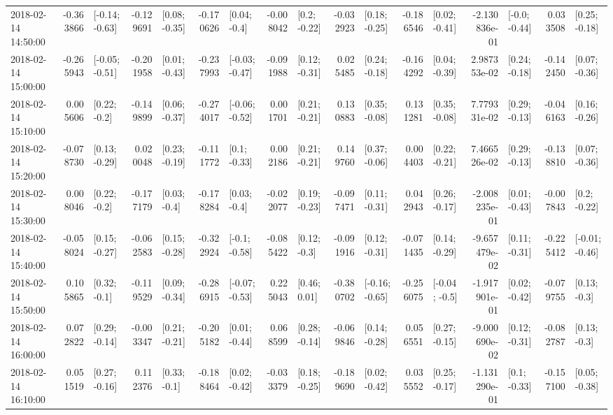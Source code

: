 \begin{tabular}{lrlrlrlrlrlrlrlrl}
2018-02-14 14:50:00 & -0.363866 &  [-0.14; -0.63] & -0.129691 &   [0.08; -0.35] & -0.170626 &    [0.04; -0.4] & -0.008042 &    [0.2; -0.22] & -0.032923 &   [0.18; -0.25] & -0.186546 &   [0.02; -0.41] & -2.130836e-01 &   [-0.0; -0.44] &  0.033508 &   [0.25; -0.18] \\
2018-02-14 15:00:00 & -0.265943 &  [-0.05; -0.51] & -0.201958 &   [0.01; -0.43] & -0.237993 &  [-0.03; -0.47] & -0.091988 &   [0.12; -0.31] &  0.025485 &   [0.24; -0.18] & -0.164292 &   [0.04; -0.39] &  2.987353e-02 &   [0.24; -0.18] & -0.142450 &   [0.07; -0.36] \\
2018-02-14 15:10:00 &  0.005606 &    [0.22; -0.2] & -0.149899 &   [0.06; -0.37] & -0.274017 &  [-0.06; -0.52] &  0.001701 &   [0.21; -0.21] &  0.130883 &   [0.35; -0.08] &  0.131281 &   [0.35; -0.08] &  7.779331e-02 &   [0.29; -0.13] & -0.046163 &   [0.16; -0.26] \\
2018-02-14 15:20:00 & -0.078730 &   [0.13; -0.29] &  0.020048 &   [0.23; -0.19] & -0.111772 &    [0.1; -0.33] &  0.002186 &   [0.21; -0.21] &  0.149760 &   [0.37; -0.06] &  0.004403 &   [0.22; -0.21] &  7.466526e-02 &   [0.29; -0.13] & -0.138810 &   [0.07; -0.36] \\
2018-02-14 15:30:00 &  0.008046 &    [0.22; -0.2] & -0.177179 &    [0.03; -0.4] & -0.178284 &    [0.03; -0.4] & -0.022077 &   [0.19; -0.23] & -0.097471 &   [0.11; -0.31] &  0.042943 &   [0.26; -0.17] & -2.008235e-01 &   [0.01; -0.43] & -0.007843 &    [0.2; -0.22] \\
2018-02-14 15:40:00 & -0.058024 &   [0.15; -0.27] & -0.062583 &   [0.15; -0.28] & -0.322924 &   [-0.1; -0.58] & -0.085422 &    [0.12; -0.3] & -0.091916 &   [0.12; -0.31] & -0.071435 &   [0.14; -0.29] & -9.657479e-02 &   [0.11; -0.31] & -0.225412 &  [-0.01; -0.46] \\
2018-02-14 15:50:00 &  0.105865 &    [0.32; -0.1] & -0.119529 &   [0.09; -0.34] & -0.286915 &  [-0.07; -0.53] &  0.225043 &    [0.46; 0.01] & -0.380702 &  [-0.16; -0.65] & -0.256075 &   [-0.04; -0.5] & -1.917901e-01 &   [0.02; -0.42] & -0.079755 &    [0.13; -0.3] \\
2018-02-14 16:00:00 &  0.072822 &   [0.29; -0.14] & -0.003347 &   [0.21; -0.21] & -0.205182 &   [0.01; -0.44] &  0.068599 &   [0.28; -0.14] & -0.069846 &   [0.14; -0.28] &  0.056551 &   [0.27; -0.15] & -9.000690e-02 &   [0.12; -0.31] & -0.082787 &    [0.13; -0.3] \\
2018-02-14 16:10:00 &  0.051519 &   [0.27; -0.16] &  0.112376 &    [0.33; -0.1] & -0.188464 &   [0.02; -0.42] & -0.033379 &   [0.18; -0.25] & -0.189690 &   [0.02; -0.42] &  0.035552 &   [0.25; -0.17] & -1.131290e-01 &    [0.1; -0.33] & -0.157100 &   [0.05; -0.38] \\

\end{tabular}
